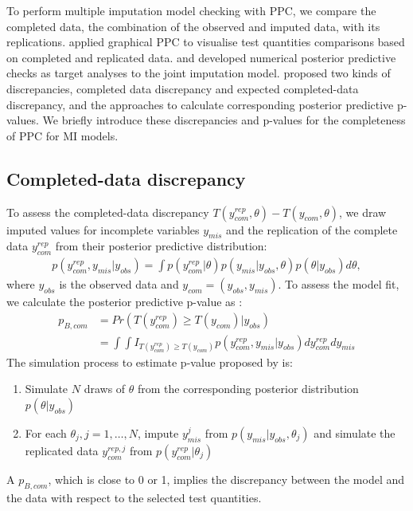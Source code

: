 	To perform multiple imputation model checking with PPC, we compare the completed data, the combination of the observed and imputed data, with its replications. \citet{gelman2005multiple} applied graphical PPC to visualise test quantities comparisons based on completed and replicated data. \citet{he2012diagnosing} and \citet{nguyen2015posterior} developed numerical posterior predictive checks as target analyses to the joint imputation model. \citet{he2012diagnosing} proposed two kinds of discrepancies, completed data discrepancy and expected completed-data discrepancy, and the approaches to calculate corresponding posterior predictive p-values. We briefly introduce these discrepancies and p-values for the completeness of PPC for MI models.
	
	\subsection{Completed-data discrepancy}
	To assess the completed-data discrepancy $T(y_{com}^{rep}, \theta) - T(y_{com}, \theta)$, we draw imputed values for incomplete variables $y_{mis}$ and the replication of the complete data $y_{com}^{rep}$ from their posterior predictive distribution:
	\begin{equation}
		\begin{array}{ll}
			p(y_{com}^{rep}, y_{mis}|y_{obs}) = \int p(y_{com}^{rep}|\theta)p(y_{mis}|y_{obs}, \theta)p(\theta|y_{obs})d\theta,
		\end{array} 
	\end{equation}
	where $y_{obs}$ is the observed data and $y_{com} = (y_{obs}, y_{mis})$. To assess the model fit, we calculate the posterior predictive p-value as :
	\begin{equation}
		\begin{array}{ll}
			p_{B, com} &= Pr(T(y_{com}^{rep}) \ge T(y_{com})|y_{obs})\\
			&= \int\int I_{T(y_{com}^{rep}) \ge T(y_{com})}p(y_{com}^{rep}, y_{mis}|y_{obs})dy_{com}^{rep}dy_{mis}
		\end{array} 
	\end{equation}
	The simulation process to estimate p-value proposed by \citet{he2012diagnosing} is:
	\begin{enumerate}
		\item Simulate $N$ draws of $\theta$ from the corresponding posterior distribution $p(\theta|y_{obs})$
		\item For each $\theta_{j}, j=1, \dots, N$, impute $y_{mis}^j$ from $p(y_{mis}|y_{obs}, \theta_{j})$ and simulate the replicated data $y_{com}^{rep, j}$ from $p(y_{com}^{rep}|\theta_{j})$
	\end{enumerate}
	A $p_{B, com}$, which is close to 0 or 1, implies the discrepancy between the model and the data with respect to the selected test quantities.  
